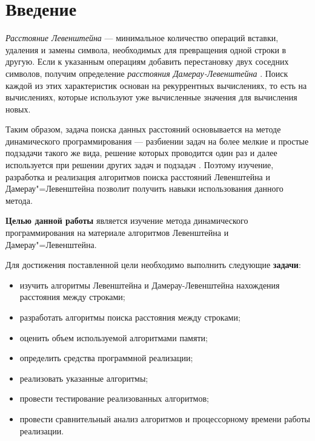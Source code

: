 \chapter*{Введение}

\textit{Расстояние Левенштейна} --- минимальное количество операций вставки,
удаления и замены символа, необходимых для превращения одной строки в другую.
Если к указанным операциям добавить перестановку двух соседних символов,
получим определение \textit{расстояния Дамерау-Левенштейна} \cite{distances}.
Поиск каждой из этих характеристик основан на рекуррентных вычислениях, то есть
на вычислениях, которые используют уже вычисленные значения для вычисления
новых.

Таким образом, задача поиска данных расстояний основывается на методе
динамического программирования --- разбиении задач на более мелкие и простые
подзадачи такого же вида, решение которых проводится один раз и далее
используется при решении других задач и подзадач \cite{dynamic}. Поэтому
изучение, разработка и реализация алгоритмов поиска расстояний Левенштейна и
Дамерау"=Левенштейна позволит получить навыки использования данного метода.

\textbf{Целью данной работы} является изучение метода динамического
программирования на материале алгоритмов Левенштейна и Дамерау"=Левенштейна. 

Для достижения поставленной цели необходимо выполнить следующие
\textbf{задачи}:
\begin{itemize}[left=\parindent]
    \item изучить алгоритмы Левенштейна и Дамерау-Левенштейна нахождения
          расстояния между строками;
    \item разработать алгоритмы поиска расстояния между строками;
    \item оценить объем используемой алгоритмами памяти;
    \item определить средства программной реализации;
    \item реализовать указанные алгоритмы;
    \item провести тестирование реализованных алгоритмов;
    \item провести сравнительный анализ алгоритмов и процессорному времени
          работы реализации.
\end{itemize}

